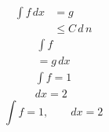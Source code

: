 \documentclass{article}
\begin{document}
\begin{equation}\begin{split} \int f\,dx &= g \\ &\le C\,d\,n \end{split}\end{equation}
\begin{multline} \int f \\ = g\,dx \end{multline}
\[\begin{gathered}\int f=1\\ dx=2\end{gathered}\]
\[\int f=1,\qquad dx=2\]
\end{document}
